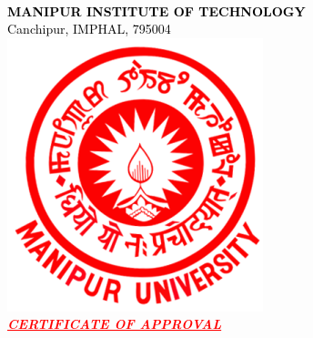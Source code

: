 \documentclass[12pt, oneside, a4paper]{book}
\begin{document}
\newpage
{}
\begingroup
    \begin{center}
        \textcolor{black}
        {
        \color{red}\large {}\\
        \normalsize \textbf{MANIPUR INSTITUTE OF TECHNOLOGY}\\
        \normalsize Canchipur, IMPHAL, 795004\\[1em]
        \includegraphics[scale=0.4]{graphics/MU Logo.png}\\[0.5em]
        }
        \textcolor{red}
        {
        \large \textit{\underline{\textbf{CERTIFICATE OF APPROVAL}}}
        }
    \end{center}
\endgroup
\end{document}
